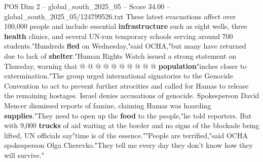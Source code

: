 \begin{textsample}{POS Dim 2 – global\_south\_2025\_05 – Score 34.00 – global\_south\_2025\_05/124799526.txt}
These latest evacuations affect over 100,000 people and include essential \textbf{infrastructure} such as eight wells, three \textbf{health} clinics, and several UN-run temporary schools serving around 700 students."Hundreds \textbf{fled} on Wednesday,"said OCHA,"but many have returned due to lack of \textbf{shelter}."Human Rights Watch issued a strong statement on Thursday, warning that @ @ @ @ @ @ @ @ @ @ \textbf{population}"inches closer to extermination."The group urged international signatories to the Genocide Convention to act to prevent further atrocities and called for Hamas to release the remaining hostages.
Israel denies accusations of genocide.
Spokesperson David Mencer dismissed reports of famine, claiming Hamas was hoarding \textbf{supplies}."They need to open up the \textbf{food} to the people,"he told reporters.
But with 9,000 \textbf{trucks} of aid waiting at the border and no signs of the blockade being lifted, UN officials say"time is of the essence.""People are terrified,"said OCHA spokesperson Olga Cherevko."They tell me every day they don't know how they will survive."

\end{textsample}
